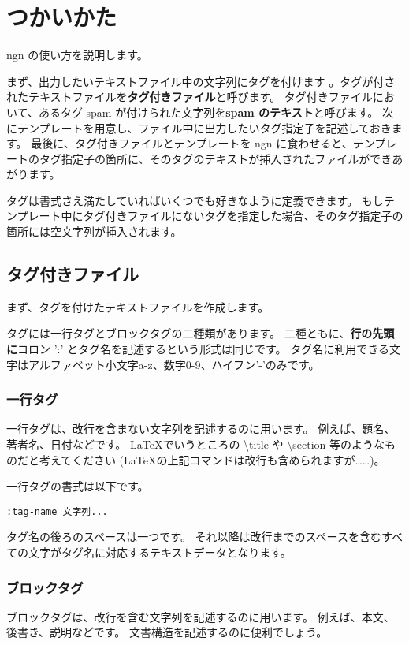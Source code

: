 \documentclass[a4j]{jsarticle}
\begin{document}
\section{つかいかた}
ngn の使い方を説明します。

まず、出力したいテキストファイル中の文字列にタグを付けます 。タグが付されたテキストファイルを\textbf{タグ付きファイル}と呼びます。
タグ付きファイルにおいて、あるタグ spam が付けられた文字列を\textbf{spam のテキスト}と呼びます。
次にテンプレートを用意し、ファイル中に出力したいタグ指定子を記述しておきます。
最後に、タグ付きファイルとテンプレートを ngn に食わせると、テンプレートのタグ指定子の箇所に、そのタグのテキストが挿入されたファイルができあがります。

タグは書式さえ満たしていればいくつでも好きなように定義できます。
もしテンプレート中にタグ付きファイルにないタグを指定した場合、そのタグ指定子の箇所には空文字列が挿入されます。


\subsection{タグ付きファイル}
まず、タグを付けたテキストファイルを作成します。


タグには一行タグとブロックタグの二種類があります。
二種ともに、\textbf{行の先頭に}コロン ':' とタグ名を記述するという形式は同じです。
タグ名に利用できる文字はアルファベット小文字a-z、数字0-9、ハイフン'-'のみです。


\subsubsection{一行タグ}
一行タグは、改行を含まない文字列を記述するのに用います。
例えば、題名、著者名、日付などです。
\LaTeX でいうところの \textbackslash title や \textbackslash section 等のようなものだと考えてください (\LaTeX の上記コマンドは改行も含められますが……)。

一行タグの書式は以下です。
\begin{lstlisting}[caption=一行タグの書式]
:tag-name 文字列...
\end{lstlisting}
タグ名の後ろのスペースは一つです。
それ以降は改行までのスペースを含むすべての文字がタグ名に対応するテキストデータとなります。


\subsubsection{ブロックタグ}
ブロックタグは、改行を含む文字列を記述するのに用います。
例えば、本文、後書き、説明などです。
文書構造を記述するのに便利でしょう。
\end{document}
